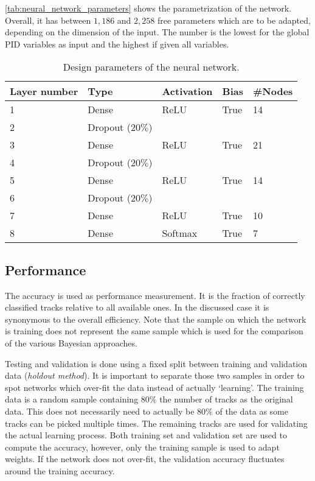 \autoref{tab:neural_network_parameters} shows the parametrization of the network. Overall, it has between $1,186$ and $2,258$ free parameters which are to be adapted, depending on the dimension of the input. The number is the lowest for the global PID variables as input and the highest if given all variables.

\begin{table}[ht]
	\centering
	\begin{tabular}{l|llll}
		Layer number & Type & Activation & Bias & \#Nodes  \\
		\hline
		1 & Dense & ReLU & True & 14 \\
		2 & Dropout ($20\%$) \\
		3 & Dense & ReLU & True & 21 \\
		4 & Dropout ($20\%$) \\
		5 & Dense & ReLU & True & 14 \\
		6 & Dropout ($20\%$) \\
		7 & Dense & ReLU & True & 10 \\
		8 & Dense & Softmax & True & 7
	\end{tabular}
	\caption{Design parameters of the neural network.}
	\label{tab:neural_network_parameters}
\end{table}

\subsection{Performance}
\label{sec:neural_network_performance}

The accuracy is used as performance measurement. It is the fraction of correctly classified tracks relative to all available ones. In the discussed case it is synonymous to the overall efficiency. Note that the sample on which the network is training does not represent the same sample which is used for the comparison of the various Bayesian approaches.

Testing and validation is done using a fixed split between training and validation data (\textit{holdout method}). It is important to separate those two samples in order to spot networks which over-fit the data instead of actually `learning'. The training data is a random sample containing $80\%$ the number of tracks as the original data. This does not necessarily need to actually be $80\%$ of the data as some tracks can be picked multiple times. The remaining tracks are used for validating the actual learning process. Both training set and validation set are used to compute the accuracy, however, only the training sample is used to adapt weights. If the network does not over-fit, the validation accuracy fluctuates around the training accuracy.

